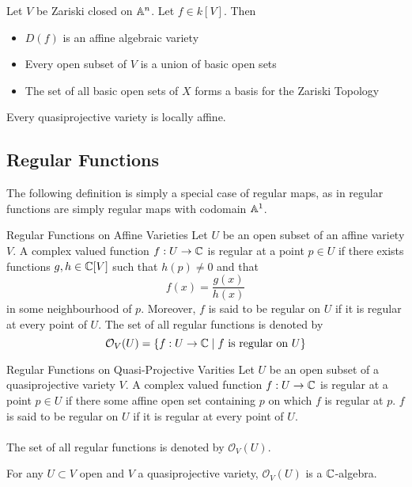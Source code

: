 \documentclass[a4paper]{article}
\begin{document}
\begin{prp}{}{} Let $V$ be Zariski closed on $\mathbb{A}^n$. Let $f\in k[V]$. Then 
\begin{itemize}
\item $D(f)$ is an affine algebraic variety
\item Every open subset of $V$ is a union of basic open sets
\item The set of all basic open sets of $X$ forms a basis for the Zariski Topology
\end{itemize}
\end{prp}

\begin{prp}{}{} Every quasiprojective variety is locally affine. 
\end{prp}

\subsection{Regular Functions}
The following definition is simply a special case of regular maps, as in regular functions are simply regular maps with codomain $\mathbb{A}^1$. 

\begin{defn}{Regular Functions on Affine Varieties}{} Let $U$ be an open subset of an affine variety $V$. A complex valued function $f:U\to\mathbb{C}$ is regular at a point $p\in U$ if there exists functions $g,h\in\mathbb{C}[V]$ such that $h(p)\neq 0$ and that $$f(x)=\frac{g(x)}{h(x)}$$ in some neighbourhood of $p$. Moreover, $f$ is said to be regular on $U$ if it is regular at every point of $U$. The set of all regular functions is denoted by $$\mathcal{O}_V(U)=\{f:U\to\mathbb{C}\;|\;f\text{ is regular on }U\}$$
\end{defn}

\begin{defn}{Regular Functions on Quasi-Projective Varities}{} Let $U$ be an open subset of a quasiprojective variety $V$. A complex valued function $f:U\to\mathbb{C}$ is regular at a point $p\in U$ if there some affine open set containing $p$ on which $f$ is regular at $p$. 
$f$ is said to be regular on $U$ if it is regular at every point of $U$. \\~\\
The set of all regular functions is denoted by $\mathcal{O}_V(U)$. 
\end{defn}

\begin{lmm}{}{} For any $U\subset V$ open and $V$ a quasiprojective variety, $\mathcal{O}_V(U)$ is a $\mathbb{C}$-algebra. 
\end{lmm}
\end{document}
